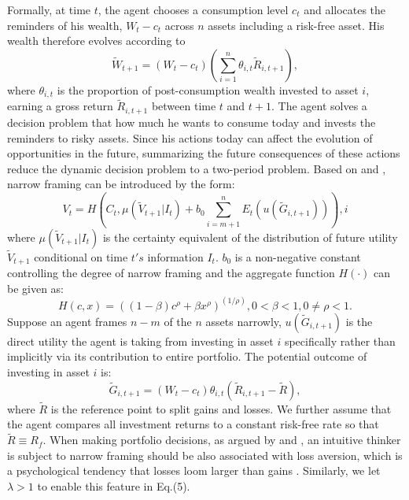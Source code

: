 \documentclass[ukenglish,nottitlepage,thmsb,11pt,letterpaper]{article}
\begin{document}
Formally, at time $t$, the agent chooses a consumption level $c_{t}$ and allocates the reminders of his wealth, $W_t - c_t$ across $n$ assets including a risk-free asset. His wealth therefore evolves according to
\begin{equation}
\widetilde{W}_{t+1} = (W_t-c_t)\left( \sum_{i=1}^{n} \theta_{i,t} \widetilde{R}_{i,t+1}  \right),
\end{equation}
where $\theta_{i,t}$ is the proportion of post-consumption wealth invested to asset $i$, earning a gross return $\widetilde{R}_{i, t+1}$ between time $t$ and $t+1$.  The agent solves a decision problem that how much he wants to consume today and invests the reminders to risky assets. Since his actions today can affect the evolution of opportunities in the future, summarizing the future consequences of these actions reduce the dynamic decision problem to a two-period problem. Based on \citet{Barberis2006} and \citet{Barberis2009}, narrow framing can be introduced by the form:
\begin{equation}
V_t = H \left( C_t, \mu(\widetilde{V}_{t+1}\vert{I_t}) + b_0 \sum_{i = m+1}^{n}E_t ( u(\widetilde{G}_{i,t+1}) ) \right),i
\end{equation}
where $\mu(\widetilde{V}_{t+1}\vert{I_t})$ is the certainty equivalent of the distribution of future utility $\widetilde{V}_{t+1}$ conditional on time $t's$ information $I_t$. $b_0$ is a non-negative constant controlling the degree of narrow framing and the aggregate function $H(\cdot)$ can be given as:
\begin{equation}
H(c,x) = \left( (1-\beta)c^\rho + \beta x^\rho \right)^ {(1/\rho)}, 0<\beta<1, 0\neq\rho<1.
\end{equation}
Suppose an agent frames $n-m$ of the $n$ assets narrowly, $u(\widetilde{G}_{i,t+1})$ is the direct utility the agent is taking from investing in asset $i$ specifically rather than implicitly via its contribution to entire portfolio. The potential outcome of investing in asset $i$ is:  \begin{equation}
\widetilde{G}_{i,t+1} = (W_t - c_t) \theta_{i,t} \left( \widetilde{R}_{i,t+1}-\widetilde{R} \right),
\end{equation}
where $\widetilde{R}$ is the reference point to split gains and losses. We further assume that the agent compares all investment returns to a constant risk-free rate so that $\widetilde{R}\equiv R_f$. When making portfolio decisions, as argued by  \citet{Kahneman2003} and \citet{Barberis2009}, an intuitive thinker is subject to narrow framing should be also associated with loss aversion, which is a psychological tendency that losses loom larger than gains \citep{Tversky1979,Tversky1992}. Similarly, we let $\lambda >1$ to enable this feature in Eq.(5).
\end{document}

